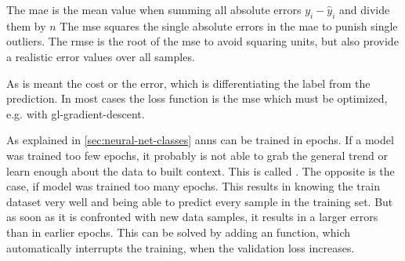 The \gls{mae} is the mean value when summing all absolute errors $y_i - \hat{y}_i$ and divide them by $n$
The \gls{mse} squares the single absolute errors in the \gls{mae} to punish single outliers.
The \gls{rmse} is the root of the \gls{mse} to avoid squaring units, but also provide a realistic error values over all samples.

As  is meant the cost or the error, which is differentiating the label from the prediction.
In most cases the loss function is the \gls{mse} which must be optimized, e.g. with \Gls{gl-gradient-descent}.

As explained in \ref{sec:neural-net-classes} \gls{ann}s can be trained in epochs.
If a model was trained too few epochs, it probably is not able to grab the general trend or learn enough about the data to built context.
This is called .
The opposite  is the case, if model was trained too many epochs.
This results in knowing the train dataset very well and being able to predict every sample in the training set.
But as soon as it is confronted with new data samples, it results in a larger errors than in earlier epochs.
This can be solved by adding an  function, which automatically interrupts the training, when the validation loss increases.

